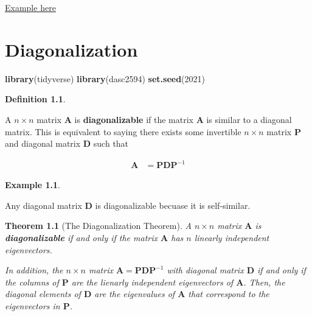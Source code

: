 \documentclass[
]{book}
\newenvironment{Shaded}{\begin{snugshade}}{\end{snugshade}}
\newcommand{\DecValTok}[1]{\textcolor[rgb]{0.00,0.00,0.81}{#1}}
\newcommand{\KeywordTok}[1]{\textcolor[rgb]{0.13,0.29,0.53}{\textbf{#1}}}
\newcommand{\NormalTok}[1]{#1}
\newtheorem{theorem}{Theorem}[chapter]
\theoremstyle{definition}
\newtheorem{definition}{Definition}[chapter]
\theoremstyle{definition}
\newtheorem{example}{Example}[chapter]
\theoremstyle{definition}
\theoremstyle{remark}
\begin{document}
\href{https://textbooks.math.gatech.edu/ila/similarity.html}{Example here}

\hypertarget{diagonalization}{%
\chapter{Diagonalization}\label{diagonalization}}

\begin{Shaded}
\begin{Highlighting}[]
\KeywordTok{library}\NormalTok{(tidyverse)}
\KeywordTok{library}\NormalTok{(dasc2594)}
\KeywordTok{set.seed}\NormalTok{(}\DecValTok{2021}\NormalTok{)}
\end{Highlighting}
\end{Shaded}

\begin{definition}
\protect\hypertarget{def:unlabeled-div-178}{}\label{def:unlabeled-div-178}

A \(n \times n\) matrix \(\mathbf{A}\) is \textbf{diagonalizable} if the matrix \(\mathbf{A}\) is similar to a diagonal matrix. This is equivalent to saying there exists some invertible \(n \times n\) matrix \(\mathbf{P}\) and diagonal matrix \(\mathbf{D}\) such that

\[
\begin{aligned}
\mathbf{A} & = \mathbf{P} \mathbf{D} \mathbf{P}^{-1}
\end{aligned}
\]

\end{definition}

\begin{example}
\protect\hypertarget{exm:unlabeled-div-179}{}\label{exm:unlabeled-div-179}

Any diagonal matrix \(\mathbf{D}\) is diagonalizable becuase it is self-similar.

\end{example}

\begin{theorem}[The Diagonalization Theorem]
\protect\hypertarget{thm:diagonalization}{}{\label{thm:diagonalization} {} }A \(n \times n\) matrix \(\mathbf{A}\) is \textbf{diagonalizable} if and only if the matrix \(\mathbf{A}\) has \(n\) linearly independent eigenvectors.

In addition, the \(n \times n\) matrix \(\mathbf{A} = \mathbf{P} \mathbf{D} \mathbf{P}^{-1}\) with diagonal matrix \(\mathbf{D}\) if and only if the columns of \(\mathbf{P}\) are the lienarly independent eigenvectors of \(\mathbf{A}\). Then, the diagonal elements of \(\mathbf{D}\) are the eigenvalues of \(\mathbf{A}\) that correspond to the eigenvectors in \(\mathbf{P}\).
\end{theorem}
\end{document}

